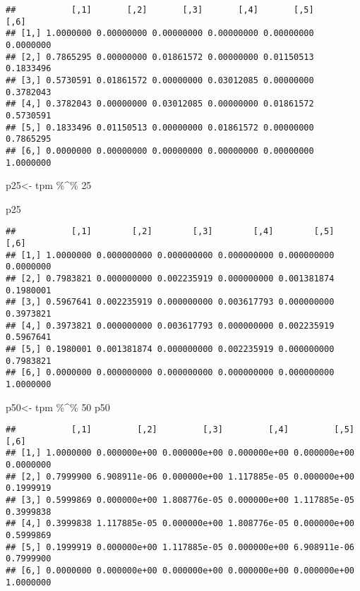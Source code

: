 \documentclass[
]{article}
\newenvironment{Shaded}{\begin{snugshade}}{\end{snugshade}}
\newcommand{\DecValTok}[1]{\textcolor[rgb]{0.00,0.00,0.81}{#1}}
\newcommand{\NormalTok}[1]{#1}
\newcommand{\OtherTok}[1]{\textcolor[rgb]{0.56,0.35,0.01}{#1}}
\newcommand{\SpecialCharTok}[1]{\textcolor[rgb]{0.00,0.00,0.00}{#1}}
\begin{document}
\begin{verbatim}
##           [,1]       [,2]       [,3]       [,4]       [,5]      [,6]
## [1,] 1.0000000 0.00000000 0.00000000 0.00000000 0.00000000 0.0000000
## [2,] 0.7865295 0.00000000 0.01861572 0.00000000 0.01150513 0.1833496
## [3,] 0.5730591 0.01861572 0.00000000 0.03012085 0.00000000 0.3782043
## [4,] 0.3782043 0.00000000 0.03012085 0.00000000 0.01861572 0.5730591
## [5,] 0.1833496 0.01150513 0.00000000 0.01861572 0.00000000 0.7865295
## [6,] 0.0000000 0.00000000 0.00000000 0.00000000 0.00000000 1.0000000
\end{verbatim}

\begin{Shaded}
\begin{Highlighting}[]
\NormalTok{p25}\OtherTok{\textless{}{-}}\NormalTok{ tpm }\SpecialCharTok{\%\^{}\%} \DecValTok{25}

\NormalTok{p25}
\end{Highlighting}
\end{Shaded}

\begin{verbatim}
##           [,1]        [,2]        [,3]        [,4]        [,5]      [,6]
## [1,] 1.0000000 0.000000000 0.000000000 0.000000000 0.000000000 0.0000000
## [2,] 0.7983821 0.000000000 0.002235919 0.000000000 0.001381874 0.1980001
## [3,] 0.5967641 0.002235919 0.000000000 0.003617793 0.000000000 0.3973821
## [4,] 0.3973821 0.000000000 0.003617793 0.000000000 0.002235919 0.5967641
## [5,] 0.1980001 0.001381874 0.000000000 0.002235919 0.000000000 0.7983821
## [6,] 0.0000000 0.000000000 0.000000000 0.000000000 0.000000000 1.0000000
\end{verbatim}

\begin{Shaded}
\begin{Highlighting}[]
\NormalTok{p50}\OtherTok{\textless{}{-}}\NormalTok{ tpm }\SpecialCharTok{\%\^{}\%} \DecValTok{50}
\NormalTok{p50}
\end{Highlighting}
\end{Shaded}

\begin{verbatim}
##           [,1]         [,2]         [,3]         [,4]         [,5]      [,6]
## [1,] 1.0000000 0.000000e+00 0.000000e+00 0.000000e+00 0.000000e+00 0.0000000
## [2,] 0.7999900 6.908911e-06 0.000000e+00 1.117885e-05 0.000000e+00 0.1999919
## [3,] 0.5999869 0.000000e+00 1.808776e-05 0.000000e+00 1.117885e-05 0.3999838
## [4,] 0.3999838 1.117885e-05 0.000000e+00 1.808776e-05 0.000000e+00 0.5999869
## [5,] 0.1999919 0.000000e+00 1.117885e-05 0.000000e+00 6.908911e-06 0.7999900
## [6,] 0.0000000 0.000000e+00 0.000000e+00 0.000000e+00 0.000000e+00 1.0000000
\end{verbatim}
\end{document}
